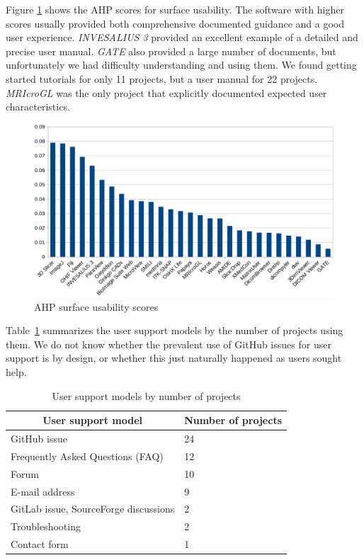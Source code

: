 \documentclass[final, 3p, times, authoryear]{elsarticle}
\begin{document}
Figure \ref{fg_usability_scores} shows the AHP scores for surface usability. The
software with higher scores usually provided both comprehensive documented
guidance and a good user experience. \textit{INVESALIUS 3} provided an excellent
example of a detailed and precise user manual. \textit{GATE} also provided a
large number of documents, but unfortunately we had difficulty understanding and
using them. We found getting started tutorials for only 11 projects, but a user
manual for 22 projects. \textit{MRIcroGL} was the only project that explicitly
documented expected user characteristics.

\begin{figure}[!ht]
\includegraphics[scale=0.38]{figures/usability_scores.png}
\caption{AHP surface usability scores}
\label{fg_usability_scores}
\end{figure}
 
Table~\ref{tab_user_support_model} summarizes the user support models by the
number of projects using them. We do not know whether the prevalent use of
GitHub issues for user support is by design, or whether this just naturally
happened as users sought help.

\begin{table}[!ht]
\centering
\begin{tabular}{ll}
\hline
\multicolumn{1}{c}{User support model} & Number of projects \\ \hline
GitHub issue & 24 \\
Frequently Asked Questions (FAQ) & 12 \\
Forum & 10 \\
E-mail address & 9 \\
GitLab issue, SourceForge discussions & 2 \\
Troubleshooting & 2 \\
Contact form & 1 \\ \hline
\end{tabular}
\caption{\label{tab_user_support_model}User support models by number of projects}
\end{table}
\end{document}
